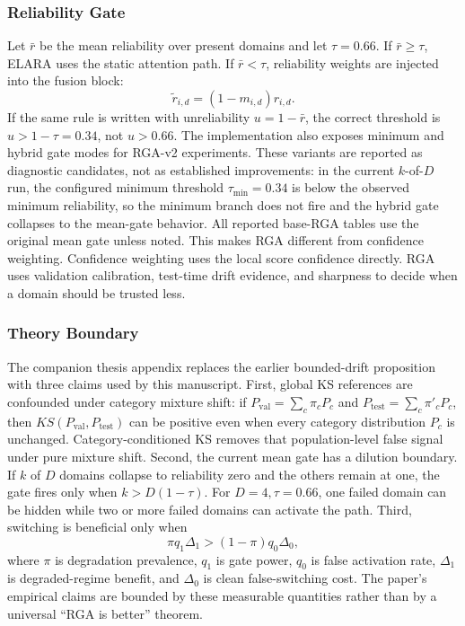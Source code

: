 \documentclass[10pt,conference]{IEEEtran}
\newcommand{\system}{ELARA}
\newcommand{\method}{RGA}
\begin{document}
\subsubsection{Reliability Gate}
Let $\bar{r}$ be the mean reliability over present domains and let $\tau=0.66$.
If $\bar{r}\geq\tau$, \system{} uses the static attention path. If
$\bar{r}<\tau$, reliability weights are injected into the fusion block:
\begin{equation}
  \tilde{r}_{i,d} = (1-m_{i,d})r_{i,d}.
\end{equation}
If the same rule is written with unreliability $u=1-\bar r$, the correct
threshold is $u>1-\tau=0.34$, not $u>0.66$. The implementation also exposes
minimum and hybrid gate modes for \method{}-v2 experiments. These variants are
reported as diagnostic candidates, not as established improvements: in the
current $k$-of-$D$ run, the configured minimum threshold
$\tau_{\min}=0.34$ is below the observed minimum reliability, so the minimum
branch does not fire and the hybrid gate collapses to the mean-gate behavior.
All reported base-\method{} tables use the original mean gate unless noted.
This makes \method{} different from confidence weighting. Confidence weighting
uses the local score confidence directly. \method{} uses validation calibration,
test-time drift evidence, and sharpness to decide when a domain should be
trusted less.

\subsubsection{Theory Boundary}
The companion thesis appendix replaces the earlier bounded-drift proposition
with three claims used by this manuscript. First, global KS references are
confounded under category mixture shift: if
$P_{\mathrm{val}}=\sum_c\pi_cP_c$ and
$P_{\mathrm{test}}=\sum_c\pi'_cP_c$, then $KS(P_{\mathrm{val}},
P_{\mathrm{test}})$ can be positive even when every category distribution
$P_c$ is unchanged. Category-conditioned KS removes that population-level
false signal under pure mixture shift. Second, the current mean gate has a
dilution boundary. If $k$ of $D$ domains collapse to reliability zero and the
others remain at one, the gate fires only when $k>D(1-\tau)$. For
$D=4,\tau=0.66$, one failed domain can be hidden while two or more failed
domains can activate the path. Third, switching is beneficial only when
\[
  \pi q_1\Delta_1 > (1-\pi)q_0\Delta_0,
\]
where $\pi$ is degradation prevalence, $q_1$ is gate power, $q_0$ is false
activation rate, $\Delta_1$ is degraded-regime benefit, and $\Delta_0$ is clean
false-switching cost. The paper's empirical claims are bounded by these
measurable quantities rather than by a universal ``RGA is better'' theorem.
\end{document}
